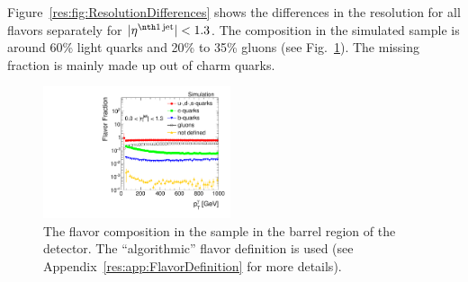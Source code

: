 Figure~\ref{res:fig:ResolutionDifferences} shows the differences in the resolution for all flavors separately for $|\etafirstjet|<1.3$.
The composition in the simulated \pythia \GAMJET sample is around 60\% light quarks and 20\% to 35\% gluons (see Fig.~\ref{res:fig:FlavorFraction}). 
The missing fraction is mainly made up out of charm quarks. 
\begin{figure}[t]
  \centering
      \includegraphics[width=0.49\textwidth]{figures/resolution/systematicUncertainties/flavorFraction_barrel_algo.pdf}
  \caption{The flavor composition in the \GAMJET sample in the barrel region of the detector. The ``algorithmic'' flavor definition is used (see Appendix~\ref{res:app:FlavorDefinition} for more details).}  
  \label{res:fig:FlavorFraction}
\end{figure}

